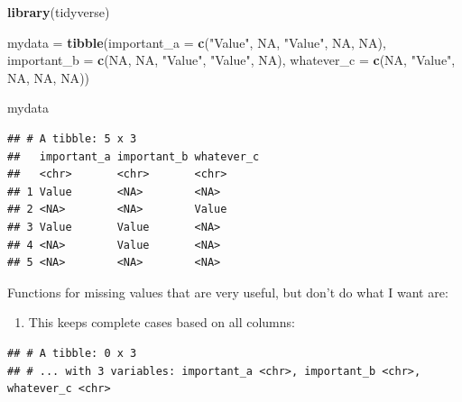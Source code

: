 \documentclass[
]{book}
\newenvironment{Shaded}{\begin{snugshade}}{\end{snugshade}}
\newcommand{\DataTypeTok}[1]{\textcolor[rgb]{0.13,0.29,0.53}{#1}}
\newcommand{\KeywordTok}[1]{\textcolor[rgb]{0.13,0.29,0.53}{\textbf{#1}}}
\newcommand{\NormalTok}[1]{#1}
\newcommand{\OperatorTok}[1]{\textcolor[rgb]{0.81,0.36,0.00}{\textbf{#1}}}
\newcommand{\OtherTok}[1]{\textcolor[rgb]{0.56,0.35,0.01}{#1}}
\newcommand{\StringTok}[1]{\textcolor[rgb]{0.31,0.60,0.02}{#1}}
\providecommand{\tightlist}{%
  \setlength{\itemsep}{0pt}\setlength{\parskip}{0pt}}
\begin{document}
\begin{Shaded}
\begin{Highlighting}[]
\KeywordTok{library}\NormalTok{(tidyverse)}

\NormalTok{mydata  =}\StringTok{ }\KeywordTok{tibble}\NormalTok{(}\DataTypeTok{important_a =} \KeywordTok{c}\NormalTok{(}\StringTok{"Value"}\NormalTok{, }\OtherTok{NA}\NormalTok{, }\StringTok{"Value"}\NormalTok{, }\OtherTok{NA}\NormalTok{, }\OtherTok{NA}\NormalTok{),}
                 \DataTypeTok{important_b =} \KeywordTok{c}\NormalTok{(}\OtherTok{NA}\NormalTok{, }\OtherTok{NA}\NormalTok{, }\StringTok{"Value"}\NormalTok{, }\StringTok{"Value"}\NormalTok{, }\OtherTok{NA}\NormalTok{),}
                 \DataTypeTok{whatever_c  =} \KeywordTok{c}\NormalTok{(}\OtherTok{NA}\NormalTok{, }\StringTok{"Value"}\NormalTok{, }\OtherTok{NA}\NormalTok{, }\OtherTok{NA}\NormalTok{, }\OtherTok{NA}\NormalTok{))}

\NormalTok{mydata}
\end{Highlighting}
\end{Shaded}

\begin{verbatim}
## # A tibble: 5 x 3
##   important_a important_b whatever_c
##   <chr>       <chr>       <chr>     
## 1 Value       <NA>        <NA>      
## 2 <NA>        <NA>        Value     
## 3 Value       Value       <NA>      
## 4 <NA>        Value       <NA>      
## 5 <NA>        <NA>        <NA>
\end{verbatim}

Functions for missing values that are very useful, but don't do what I want are:

\begin{enumerate}
\def\labelenumi{(\arabic{enumi})}
\tightlist
\item
  This keeps complete cases based on all columns:
\end{enumerate}

\begin{Shaded}
\end{Shaded}

\begin{verbatim}
## # A tibble: 0 x 3
## # ... with 3 variables: important_a <chr>, important_b <chr>, whatever_c <chr>
\end{verbatim}
\end{document}
